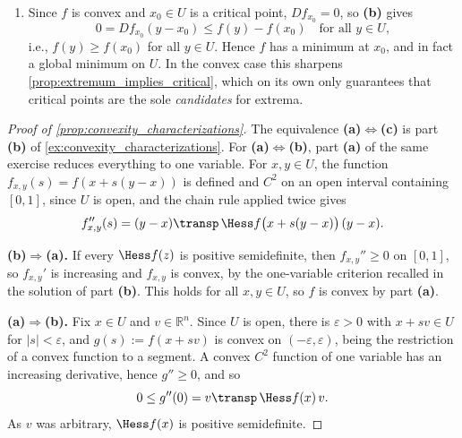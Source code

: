 \begin{exercisesolution}
\begin{enumerate}[label=\textbf{(\alph*)}]
    \begin{remark}
    The argument above only ever used differentiability of $f$, never twice-differentiability, so
    the equivalence in \textbf{(b)} already holds for $f \in C^1(U)$ with $U \subseteq
    \mathbb{R}^n$ open and convex, one order of regularity weaker than
    , which is stated for $f \in C^2(U)$. This is exactly
    the fact used in \cref{ex:convexity_properties_multiple_choice}\textbf{(b)}.
    \end{remark}
  \item Since $f$ is convex and $x_0 \in U$ is a critical point, $Df_{x_0} = 0$, so \textbf{(b)}
    gives
    \[0 = Df_{x_0}(y-x_0) \leq f(y)-f(x_0) \quad \text{for all } y \in U,\]
    i.e., $f(y) \geq f(x_0)$ for all $y \in U$. Hence $f$ has a minimum at $x_0$, and in fact a
    global minimum on $U$. In the convex case this sharpens
    \cref{prop:extremum_implies_critical}, which on its own only guarantees that critical points
    are the sole \emph{candidates} for extrema.
\end{enumerate}
\end{exercisesolution}

\begin{proof}[Proof of \cref{prop:convexity_characterizations}]
The equivalence \textbf{(a)}$\iff$\textbf{(c)} is part \textbf{(b)} of
\cref{ex:convexity_characterizations}. For \textbf{(a)}$\iff$\textbf{(b)}, part \textbf{(a)} of
the same exercise reduces everything to one variable. For $x, y \in U$, the function
$f_{x,y}(s) = f(x+s(y-x))$ is defined and $C^2$ on an open interval containing $[0,1]$, since
$U$ is open, and the chain rule applied twice gives
\[f_{x,y}''(s) = (y-x)\transp\,\Hess f\big(x+s(y-x)\big)\,(y-x).\]

\textbf{(b)$\Rightarrow$(a).} If every $\Hess f(z)$ is positive semidefinite, then
$f_{x,y}'' \geq 0$ on $[0,1]$, so $f_{x,y}'$ is increasing and $f_{x,y}$ is convex, by the
one-variable criterion recalled in the solution of part \textbf{(b)}. This holds for all
$x, y \in U$, so $f$ is convex by part \textbf{(a)}.

\textbf{(a)$\Rightarrow$(b).} Fix $x \in U$ and $v \in \mathbb{R}^n$. Since $U$ is open, there is
$\varepsilon > 0$ with $x + sv \in U$ for $|s| < \varepsilon$, and $g(s) := f(x+sv)$ is convex on
$(-\varepsilon,\varepsilon)$, being the restriction of a convex function to a segment. A convex
$C^2$ function of one variable has an increasing derivative, hence $g'' \geq 0$, and so
\[0 \leq g''(0) = v\transp\,\Hess f(x)\,v.\]
As $v$ was arbitrary, $\Hess f(x)$ is positive semidefinite.
\end{proof}

